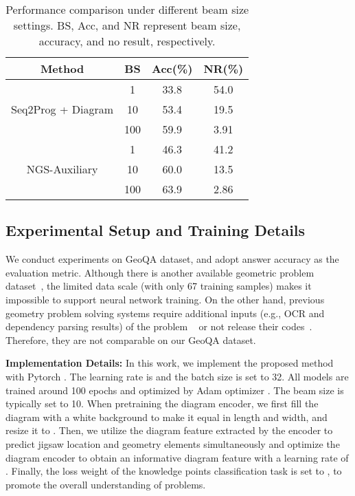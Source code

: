 \documentclass[11pt,a4paper]{article}
\begin{document}
\begin{table}[htbp]
\centering
\resizebox{0.9\linewidth}{!} {
\begin{tabular}{c|c|c|c}
\hline
Method & BS & Acc(\%) & NR(\%) \\
\hline
\hline
 & 1 & 33.8 & 54.0 \\
 Seq2Prog + Diagram & 10 & 53.4 & 19.5 \\
& 100 & 59.9 & 3.91 \\
\hline
& 1 & 46.3 & 41.2 \\
NGS-Auxiliary & 10 & 60.0 & 13.5 \\
& 100 & 63.9 & 2.86 \\
\hline
\end{tabular}
}
\caption{Performance comparison under different beam size settings. BS, Acc, and NR represent beam size, accuracy, and no result, respectively.}
\label{table-beam}
\end{table}






\subsection{Experimental Setup and Training Details }

We conduct experiments on GeoQA dataset, and adopt answer accuracy as the evaluation metric. Although there is another  available geometric problem dataset~\cite{seo2015solving}, the limited data scale (with only 67 training samples) makes it impossible to support neural network training. On the other hand, previous geometry problem solving systems require additional inputs (e.g.,  OCR and dependency parsing results) of the problem ~\cite{jgex, seo-etal-2015-solving} or not release their codes~\cite{sachan2017learning,sachan2020knowledge}. Therefore, they are not comparable on our GeoQA dataset.





 



\textbf{Implementation Details:}
In this work, we implement the proposed method with Pytorch \cite{paszke2017automatic}. 
The learning rate is  and the batch size is set to 32. All models are trained around 100 epochs and optimized by Adam optimizer \cite{kingma2014adam}. The beam size is typically set to 10.
When pretraining the diagram encoder, 
we first fill the diagram with a white background to make it equal in length and width, and resize it to .
Then, we utilize the diagram feature extracted by the encoder to predict jigsaw location and geometry elements simultaneously and optimize the diagram encoder to obtain an informative diagram feature with a learning rate of . Finally, the loss weight of the knowledge points classification task is set to , to promote the overall understanding of problems.
\end{document}
